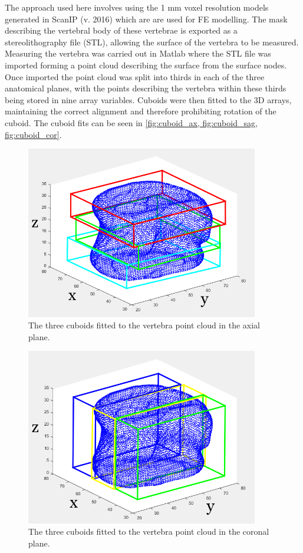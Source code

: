 The approach used here involves using the 1 mm voxel resolution models
generated in ScanIP (v. 2016) which are are used for FE modelling.  The mask
describing the vertebral body of these vertebrae is exported as a
stereolithography file (STL), allowing the surface of the vertebra to be
measured.  Measuring the vertebra was carried out in Matlab where the STL file
was imported forming a point cloud describing the surface from the surface
nodes.  Once imported the point cloud was split into thirds in each of the
three anatomical planes, with the points describing the vertebra within these
thirds being stored in nine array variables.  Cuboids were then fitted to the
3D arrays, maintaining the correct alignment and therefore prohibiting rotation
of the cuboid.  The cuboid fits can be seen in \cref{fig:cuboid_ax,
fig:cuboid_sag, fig:cuboid_cor}.


\begin{figure}[ht!]
  \centering
  \includegraphics[width=4in]{Chapters/Chapter_PCA_images/Cuboid_fit_axial.png}
  \caption{The three cuboids fitted to the vertebra point cloud in the axial plane.}
  \label{fig:cuboid_ax}
\end{figure}

\begin{figure}[ht!]
  \centering
  \includegraphics[width=4in]{Chapters/Chapter_PCA_images/Cuboid_fit_coronal.png}
  \caption{The three cuboids fitted to the vertebra point cloud in the coronal plane.}
  \label{fig:cuboid_cor}
\end{figure}

